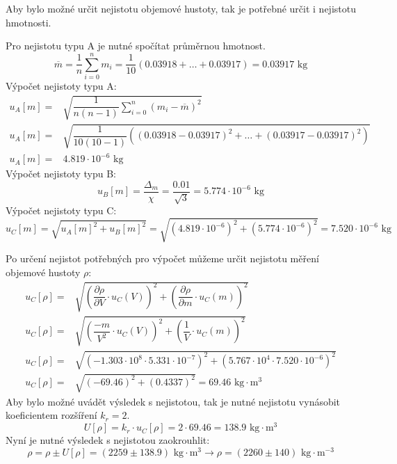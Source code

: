 \documentclass[fleqn]{protokol}
\newcommand{\neweq}{\\[0.8ex]}
\begin{document}
        Aby bylo možné určit nejistotu objemové hustoty, tak je potřebné určit i nejistotu hmotnosti. 

        Pro nejistotu typu A je nutné spočítat průměrnou hmotnost.
        \begin{equation*}
            \overline{m} = \dfrac{1}{n} \sum_{i = 0}^{n} m_i = \dfrac{1}{10} (0.03918 + \dots + 0.03917) = 0.03917\text{ kg}
        \end{equation*}
        Výpočet nejistoty typu A\cite{nejistoty}:
        \begin{align*}
            u_A[m] = &\sqrt{ \dfrac{1}{n(n-1)} \sum_{i = 0}^{n} (m_i - \overline{m})^2 } \neweq
            u_A[m] = &\sqrt{ \dfrac{1}{10(10-1)} ((0.03918 - 0.03917)^2 + \dots + (0.03917 - 0.03917)^2) } \neweq
            u_A[m] = &4.819 \cdot 10^{-6} \text{ kg}
        \end{align*}
        Výpočet nejistoty typu B\cite{nejistoty_prezentace}:
        \begin{equation*}
            u_B[m] = \dfrac{\Delta_m}{\chi} = \dfrac{0.01}{\sqrt{3}} = 5.774 \cdot 10^{-6} \text{ kg}
        \end{equation*}
        Výpočet nejistoty typu C\cite{nejistoty_prezentace}:
        \begin{equation*}
            u_C[m] = \sqrt{ u_A[m]^2 + u_B[m]^2  } = \sqrt{ (4.819 \cdot 10^{-6})^2 + (5.774 \cdot 10^{-6})^2 } = 7.520 \cdot 10^{-6} \text{ kg}
        \end{equation*}

        \pagebreak
        Po určení nejistot potřebných pro výpočet můžeme určit nejistotu měření objemové hustoty $\rho$\cite{nejistoty}:
        \begin{align*}
            u_C[\rho] = &\sqrt{ \left( \dfrac{\partial \rho}{\partial V} \cdot u_C(V) \right)^2 + \left( \dfrac{\partial \rho}{\partial m} \cdot u_C(m) \right)^2} \neweq
            u_C[\rho] = &\sqrt{ \left( \dfrac{-m}{V^2} \cdot u_C(V) \right)^2 + \left( \dfrac{1}{V} \cdot u_C(m) \right)^2  } \neweq
            u_C[\rho] = &\sqrt{ \left( -1.303 \cdot 10^{8} \cdot 5.331\cdot 10^{-7} \right)^2 + \left( 5.767 \cdot 10^{4} \cdot 7.520 \cdot 10^{-6} \right)^2  } \neweq
            u_C[\rho] = &\sqrt{ \left( -69.46  \right)^2 + \left( 0.4337 \right)^2  } = 69.46 \text{ kg$\cdot$m$^3$}
        \end{align*}
        Aby bylo možné uvádět výsledek s nejistotou, tak je nutné nejistotu vynásobit koeficientem rozšíření $k_r = 2$\cite{nejistoty_prezentace}.
        \begin{equation*}
            U[\rho] = k_r \cdot u_C[\rho] = 2 \cdot 69.46 = 138.9 \text{ kg$\cdot$m$^3$}
        \end{equation*}
        Nyní je nutné výsledek s nejistotou zaokrouhlit\cite{zaokrouhlovani}: 
        \begin{equation*}
            \rho = \rho \pm U[\rho] = (2259 \pm 138.9) \text{ kg$\cdot$m$^3$} \rightarrow \boxed{ \rho = (2260 \pm 140) \text{ kg$\cdot$m$^{-3}$}}
        \end{equation*}
\end{document}
